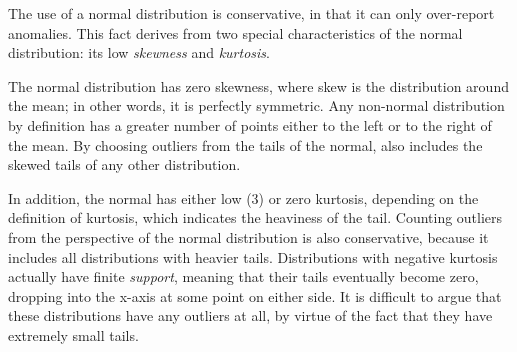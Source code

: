 The use of a normal distribution is conservative, in that it can only
over-report anomalies. This fact derives from two special
characteristics of the normal distribution: its low \emph{skewness}
and \emph{kurtosis}.

The normal distribution has zero skewness, where
skew is the distribution around the mean; in other words, it is
perfectly symmetric. Any non-normal distribution by definition has a
greater number of points either to the left or to the right of the
mean. By choosing outliers from the tails of the normal, \checkcell{}
also includes the skewed tails of any other distribution.

In addition, the normal has either low (3) or zero kurtosis, depending
on the definition of kurtosis, which indicates the heaviness of the
tail. Counting outliers from the perspective of the normal
distribution is also conservative, because it includes all
distributions with heavier tails. Distributions with negative kurtosis
actually have finite \emph{support}, meaning that their tails
eventually become zero, dropping into the x-axis at some point on
either side. It is difficult to argue that these distributions have
any outliers at all, by virtue of the fact that they have extremely
small tails.

